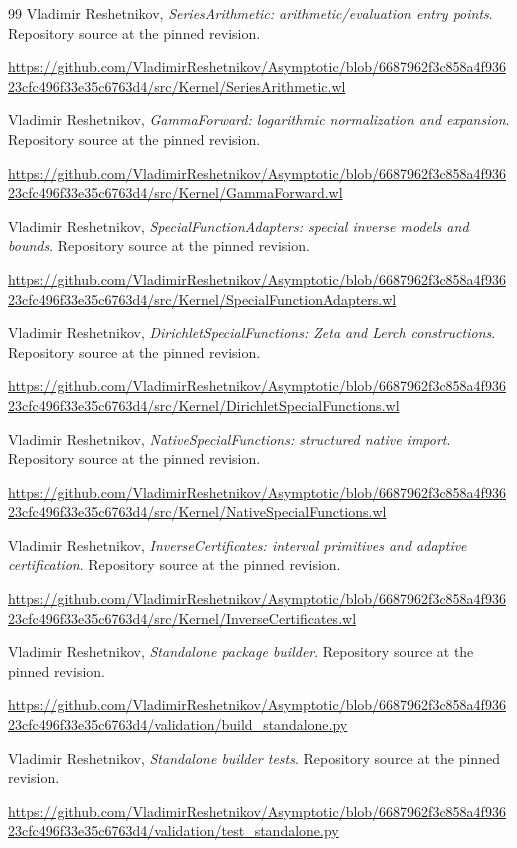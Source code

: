 \documentclass[11pt,a4paper]{article}
\begin{document}
\begin{thebibliography}{99}
 Vladimir Reshetnikov, \emph{SeriesArithmetic: arithmetic/evaluation entry points}. Repository source at the pinned revision.\par
\url{https://github.com/VladimirReshetnikov/Asymptotic/blob/6687962f3c858a4f93623cfc496f33e35c6763d4/src/Kernel/SeriesArithmetic.wl}

 Vladimir Reshetnikov, \emph{GammaForward: logarithmic normalization and expansion}. Repository source at the pinned revision.\par
\url{https://github.com/VladimirReshetnikov/Asymptotic/blob/6687962f3c858a4f93623cfc496f33e35c6763d4/src/Kernel/GammaForward.wl}

 Vladimir Reshetnikov, \emph{SpecialFunctionAdapters: special inverse models and bounds}. Repository source at the pinned revision.\par
\url{https://github.com/VladimirReshetnikov/Asymptotic/blob/6687962f3c858a4f93623cfc496f33e35c6763d4/src/Kernel/SpecialFunctionAdapters.wl}

 Vladimir Reshetnikov, \emph{DirichletSpecialFunctions: Zeta and Lerch constructions}. Repository source at the pinned revision.\par
\url{https://github.com/VladimirReshetnikov/Asymptotic/blob/6687962f3c858a4f93623cfc496f33e35c6763d4/src/Kernel/DirichletSpecialFunctions.wl}

 Vladimir Reshetnikov, \emph{NativeSpecialFunctions: structured native import}. Repository source at the pinned revision.\par
\url{https://github.com/VladimirReshetnikov/Asymptotic/blob/6687962f3c858a4f93623cfc496f33e35c6763d4/src/Kernel/NativeSpecialFunctions.wl}

 Vladimir Reshetnikov, \emph{InverseCertificates: interval primitives and adaptive certification}. Repository source at the pinned revision.\par
\url{https://github.com/VladimirReshetnikov/Asymptotic/blob/6687962f3c858a4f93623cfc496f33e35c6763d4/src/Kernel/InverseCertificates.wl}

 Vladimir Reshetnikov, \emph{Standalone package builder}. Repository source at the pinned revision.\par
\url{https://github.com/VladimirReshetnikov/Asymptotic/blob/6687962f3c858a4f93623cfc496f33e35c6763d4/validation/build_standalone.py}

 Vladimir Reshetnikov, \emph{Standalone builder tests}. Repository source at the pinned revision.\par
\url{https://github.com/VladimirReshetnikov/Asymptotic/blob/6687962f3c858a4f93623cfc496f33e35c6763d4/validation/test_standalone.py}


\end{thebibliography}
\end{document}
